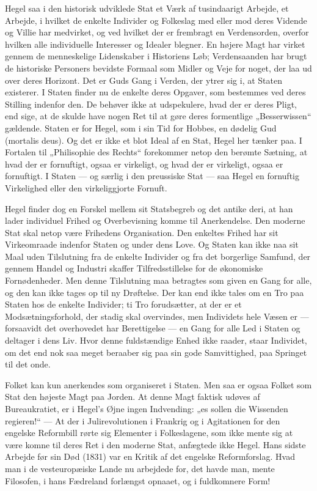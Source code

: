 \documentclass[12pt,a4paper,openany]{book}
\newcommand{\opage}[1]{\marginnote{\footnotesize\textit{[#1]}}}
\begin{document}
Hegel saa i den historisk udviklede Stat et Værk af tusindaarigt
Arbejde, et Arbejde, i hvilket de enkelte Individer og Folkeslag med
eller mod deres Vidende og Villie har medvirket, og ved hvilket der
er frembragt en Verdensorden, overfor hvilken alle individuelle Interesser
og Idealer blegner. En højere Magt har virket gennem de
menneskelige Lidenskaber i Historiens Løb; Verdensaanden har
brugt de historiske Personers bevidste Formaal som Midler og Veje
for noget, der laa ud over deres Horizont. Det er Guds Gang i Verden,
der ytrer sig i, at Staten existerer. I Staten finder nu de enkelte
deres Opgaver, som bestemmes ved deres Stilling indenfor den. De
behøver ikke at udspekulere, hvad der er deres Pligt, end sige, at de
skulde have nogen Ret til at gøre deres formentlige „Besserwissen“
\opage{106}gældende. Staten er for Hegel, som i sin Tid for Hobbes, en dødelig
Gud (mortalis deus). Og det er ikke et blot Ideal af en Stat, Hegel
her tænker paa. I Fortalen til „Philisophie des Rechts“ forekommer
netop den berømte Sætning, at hvad der er fornuftigt, ogsaa er virkeligt,
og hvad der er virkeligt, ogsaa er fornuftigt. I Staten --- og særlig
i den preussiske Stat --- saa Hegel en fornuftig Virkelighed eller den
virkeliggjorte Fornuft.

Hegel finder dog en Forskel mellem sit Statsbegreb og det antike
deri, at han lader individuel Frihed og Overbevisning komme til
Anerkendelse. Den moderne Stat skal netop være Frihedens Organisation.
Den enkeltes Frihed har sit Virkeomraade indenfor Staten
og under dens Love. Og Staten kan ikke naa sit Maal uden Tilslutning
fra de enkelte Individer og fra det borgerlige Samfund, der gennem
Handel og Industri skaffer Tilfredsstillelse for de økonomiske
Fornødenheder. Men denne Tilslutning maa betragtes som given en
Gang for alle, og den kan ikke tages op til ny Drøftelse. Der kan end
ikke tales om en Tro paa Staten hos de enkelte Individer; ti Tro
forudsætter, at der er et Modsætningsforhold, der stadig skal overvindes,
men Individets hele Væsen er --- forsaavidt det overhovedet
har Berettigelse --- en Gang for alle Led i Staten og deltager i dens
Liv. Hvor denne fuldstændige Enhed ikke raader, staar Individet,
om det end nok saa meget beraaber sig paa sin gode Samvittighed,
paa Springet til det onde.

Folket kan kun anerkendes som organiseret i Staten. Men saa er
ogsaa Folket som Stat den højeste Magt paa Jorden. At denne Magt
faktisk udøves af Bureaukratiet, er i Hegel’s Øjne ingen Indvending:
„es sollen die Wissenden regieren!“ --- At der i Julirevolutionen i
Frankrig og i Agitationen for den engelske Reformbill rørte sig Elementer
i Folkeslagene, som ikke mente sig at være komne til deres
Ret i den moderne Stat, anfægtede ikke Hegel. Hans sidste Arbejde
før sin Død (1831) var en Kritik af det engelske Reformforslag. Hvad
man i de vesteuropæiske Lande nu arbejdede for, det havde man,
mente Filosofen, i hans Fædreland forlængst opnaaet, og i fuldkomnere
Form!
\end{document}
